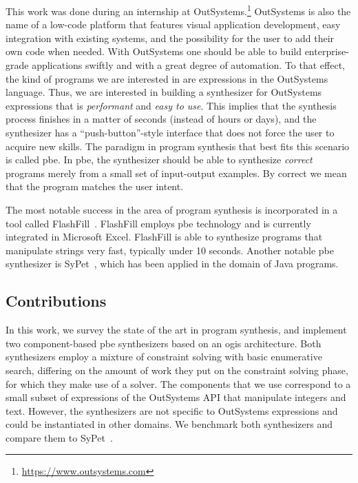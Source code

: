 This work was done during an internship at
OutSystems.\footnote{\url{https://www.outsystems.com}} 
OutSystems is also the name of a low-code platform that features visual
application development, easy integration with existing systems, and the
possibility for the user to add their own code when needed.
With OutSystems one should be able to build enterprise-grade applications
swiftly and with a great degree of
automation.
To that effect, the kind of programs we are interested in are expressions in the
OutSystems language.
Thus, we are interested in building a synthesizer for OutSystems expressions
that is \textit{performant} and \textit{easy to use}.
This implies that the synthesis process finishes in a matter of seconds
(instead of hours or days), and the synthesizer has a ``push-button''-style
interface that does not force the user to acquire new skills.
The paradigm in program synthesis that best fits this scenario is called
\gls{pbe}.
In \gls{pbe}, the synthesizer should be able to synthesize \textit{correct}
programs merely from a small set of input-output examples.
By correct we mean that the program matches the user intent.

The most notable success in the area of program synthesis is incorporated in a
tool called FlashFill~\cite{Gulwani:2011}.
FlashFill employs \gls{pbe} technology and is currently integrated in Microsoft
Excel.
FlashFill is able to synthesize programs that manipulate strings very fast,
typically under 10 seconds.
Another notable \gls{pbe} synthesizer is SyPet~\cite{Feng:2017:CSC}, which has
been applied in the domain of Java programs.

\subsection{Contributions}

In this work, we survey the state of the art in program synthesis, and
implement two component-based \gls{pbe} synthesizers based on an \gls{ogis}
architecture.
Both synthesizers employ a mixture of constraint solving with basic enumerative
search, differing on the amount of work they put on the constraint solving
phase, for which they make use of a  solver.
The components that we use correspond to a small subset of expressions of the
OutSystems API that manipulate integers and text.
However, the synthesizers are not specific to OutSystems expressions and could
be instantiated in other domains.
We benchmark both synthesizers and compare them to SyPet~\cite{Feng:2017:CSC}.